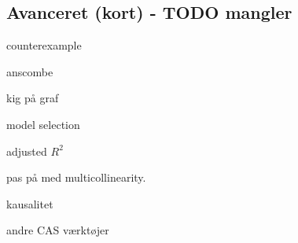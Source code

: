 \subsection{Avanceret (kort) - TODO mangler}
counterexample

anscombe

kig på graf

model selection

adjusted \(R^2\)

pas på med multicollinearity.

kausalitet

andre CAS værktøjer

